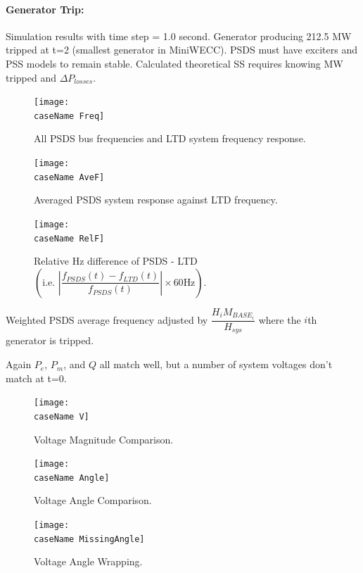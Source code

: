\documentclass[12pt]{article}
\begin{document}
\paragraph{Generator Trip:} Simulation results with time step = 1.0 second. Generator producing 212.5 MW tripped at t=2 (smallest generator in MiniWECC). PSDS must have exciters and PSS models to remain stable. Calculated theoretical SS requires knowing MW tripped and $\Delta P_{losses}$.

\newcommand{\caseName}{miniWECCgenTrip0}
	\begin{figure}[h!]
			\centering
			\texttt{[image: \\caseName Freq]}\vspace{-1em}
			\caption{All PSDS bus frequencies and LTD system frequency response.}
			\label{fcomp}		 
	\end{figure}\vspace{-2em}


	\begin{figure}[h!]
				\centering
				\texttt{[image: \\caseName AveF]}  \vspace{-2em}
				\caption{Averaged PSDS system response against LTD frequency.} 
				\label{aveF}
	\end{figure}\vspace{-2em}
	\begin{figure}[h!]	
				\centering
				\texttt{[image: \\caseName RelF]}  \vspace{-1.5em}
				\caption{Relative Hz difference of PSDS - LTD $\left( \text{i.e. }  \left|\dfrac{f_{PSDS}(t)- f_{LTD}(t)}{f_{PSDS}(t)}\right| \times 60 \text{Hz} \right)$.}
				\label{redDif}
	\end{figure}
Weighted PSDS average frequency adjusted by $\dfrac{H_i M_{BASE_i}}{H_{sys}}$ where the $i$th generator is tripped.

\pagebreak

Again $P_e$, $P_m$, and $Q$ all match well, but a number of system voltages don't match at t=0.

	\begin{figure}[h!]
			\centering
			\texttt{[image: \\caseName V]}\vspace{-1em}
			\caption{Voltage Magnitude Comparison.}
			\label{vMag}		 
	\end{figure}\vspace{-2em}
	\begin{figure}[h!]
				\centering
				\texttt{[image: \\caseName Angle]}  \vspace{-2em}
				\caption{Voltage Angle Comparison.} 
				\label{vAng}
	\end{figure}\vspace{-2em}
	\begin{figure}[h!]
				\centering
				\texttt{[image: \\caseName MissingAngle]}  \vspace{-2em}
				\caption{Voltage Angle Wrapping.} 
				\label{vAng}
	\end{figure}\vspace{-2em}
\end{document}
